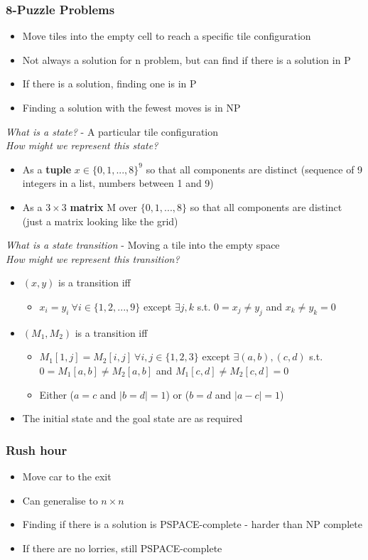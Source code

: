 \documentclass{article}[18pt]
\begin{document}
\subsubsection{8-Puzzle Problems}
\begin{itemize}
	\item Move tiles into the empty cell to reach a specific tile configuration
	\item Not always a solution for n problem, but can find if there is a solution in P
	\item If there is a solution, finding one is in P
	\item Finding a solution with the fewest moves is in NP
\end{itemize}
\textit{What is a state?} - A particular tile configuration\\
\textit{How might we represent this state?}
\begin{itemize}
	\item As a \textbf{tuple} $x\in \{0,1,...,8\}^9$ so that all components are distinct (sequence of 9 integers in a list, numbers between 1 and 9)
	\item As a $3\times 3$ \textbf{matrix} M over $\{0,1,...,8\}$ so that all components are distinct (just a matrix looking like the grid)
\end{itemize}
\textit{What is a state transition} - Moving a tile into the empty space\\
\textit{How might we represent this transition?}
\begin{itemize}
	\item $(x,y)$ is a transition iff
	\begin{itemize}
		\item $x_i=y_i \ \forall i \in \{1,2,...,9\}$ except $\exists j,k$ s.t. $0=x_j\neq y_j$ and $x_k\neq y_k=0$
	\end{itemize}
	\item $(M_1,M_2)$ is a transition iff
	\begin{itemize}
		\item $M_1[1,j]=M_2[i,j] \ \forall i, j \in \{1,2,3\}$ except $\exists (a,b), (c,d)$  s.t.$0=M_1[a,b]\neq M_2[a,b]$ and $M_1[c,d]\neq M_2[c,d]=0$
		\item Either ($a=c$ and $|b=d|=1$) or ($b=d$ and $|a-c|=1$)
	\end{itemize}
	\item The initial state and the goal state are as required
\end{itemize}
\subsubsection{Rush hour}
\begin{itemize}
	\item Move car to the exit
	\item Can generalise to $n\times n$
	\item Finding if there is a solution is PSPACE-complete - harder than NP complete
	\item If there are no lorries, still PSPACE-complete
\end{itemize}
\end{document}
